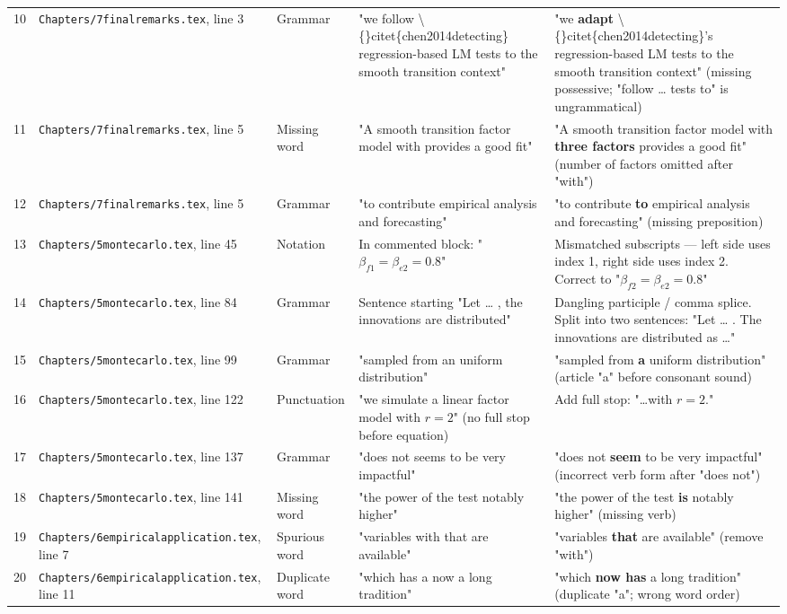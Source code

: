 \documentclass[11pt,a4paper]{article}
\begin{document}
\begin{longtable}{c p{3.2cm} l p{3.8cm} p{3.5cm}}
10 & \texttt{Chapters/7finalremarks.tex}, line 3 & Grammar & "we follow \textbackslash\{\}citet\{chen2014detecting\} regression-based LM tests to the smooth transition context" & "we \textbf{adapt} \textbackslash\{\}citet\{chen2014detecting\}'s regression-based LM tests to the smooth transition context" (missing possessive; "follow … tests to" is ungrammatical) \\
11 & \texttt{Chapters/7finalremarks.tex}, line 5 & Missing word & "A smooth transition factor model with provides a good fit" & "A smooth transition factor model with \textbf{three factors} provides a good fit" (number of factors omitted after "with") \\
12 & \texttt{Chapters/7finalremarks.tex}, line 5 & Grammar & "to contribute empirical analysis and forecasting" & "to contribute \textbf{to} empirical analysis and forecasting" (missing preposition) \\
13 & \texttt{Chapters/5montecarlo.tex}, line 45 & Notation & In commented block: "$\beta_{f1}=\beta_{e2}=0.8$" & Mismatched subscripts — left side uses index 1, right side uses index 2. Correct to "$\beta_{f2}=\beta_{e2}=0.8$" \\
14 & \texttt{Chapters/5montecarlo.tex}, line 84 & Grammar & Sentence starting "Let … , the innovations are distributed" & Dangling participle / comma splice. Split into two sentences: "Let … . The innovations are distributed as …" \\
15 & \texttt{Chapters/5montecarlo.tex}, line 99 & Grammar & "sampled from an uniform distribution" & "sampled from \textbf{a} uniform distribution" (article "a" before consonant sound) \\
16 & \texttt{Chapters/5montecarlo.tex}, line 122 & Punctuation & "we simulate a linear factor model with $r =2$" (no full stop before equation) & Add full stop: "…with $r=2$." \\
17 & \texttt{Chapters/5montecarlo.tex}, line 137 & Grammar & "does not seems to be very impactful" & "does not \textbf{seem} to be very impactful" (incorrect verb form after "does not") \\
18 & \texttt{Chapters/5montecarlo.tex}, line 141 & Missing word & "the power of the test notably higher" & "the power of the test \textbf{is} notably higher" (missing verb) \\
19 & \texttt{Chapters/6empiricalapplication.tex}, line 7 & Spurious word & "variables with that are available" & "variables \textbf{that} are available" (remove "with") \\
20 & \texttt{Chapters/6empiricalapplication.tex}, line 11 & Duplicate word & "which has a now a long tradition" & "which \textbf{now has} a long tradition" (duplicate "a"; wrong word order) \\

\end{longtable}
\end{document}
